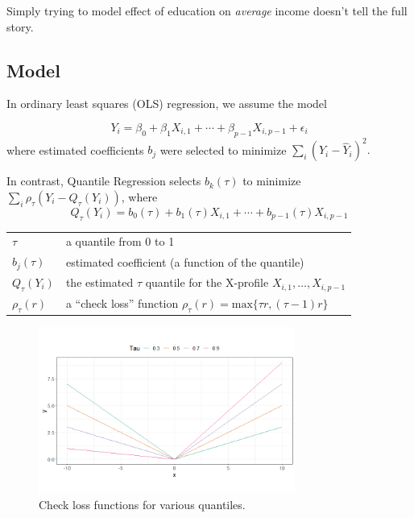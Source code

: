 \documentclass[12pt]{notes}
\begin{document}
\nspace 
Simply trying to model effect of education on \textit{average} income doesn't tell the full story. 

\subsection{Model}
In ordinary least squares (OLS) regression, we assume the model 

$$Y_i = \beta_0 + \beta_1X_{i, 1} + \cdots + \beta_{p-1}X_{i, p-1} + \epsilon_i$$ where estimated coefficients $b_j$ were selected to minimize $\sum_i\left(Y_i - \hat{Y}_i\right)^2.$

\nspace
In contrast, Quantile Regression selects $b_k(\tau)$ to minimize $\sum_i\rho_\tau\left(Y_i - Q_\tau(Y_i)\right)$, where
$$Q_\tau(Y_i) = b_0(\tau) + b_1(\tau)X_{i, 1} + \cdots + b_{p-1}(\tau)X_{i, p-1}$$
\begin{tabular}{ll}
$\tau$ & a quantile from 0 to 1 \\
$b_j(\tau)$ & estimated coefficient (a function of the quantile) \\
$Q_\tau(Y_i)$ & the estimated $\tau$ quantile for the X-profile $X_{i, 1}, \ldots, X_{i, p-1}$ \\
$\rho_\tau(r)$ & a ``check loss'' function $\rho_\tau(r) = \text{max}\{\tau r, (\tau - 1)r\}$
\end{tabular}


\begin{minipage}[l][3cm][c]{\textwidth}

\end{minipage}

\begin{figure}[H]
\centering
\includegraphics[width=0.75\textwidth]{figures/module7/checkloss.png}
\caption{Check loss functions for various quantiles.}
\label{fig:checkloss}
\end{figure}
\end{document}
